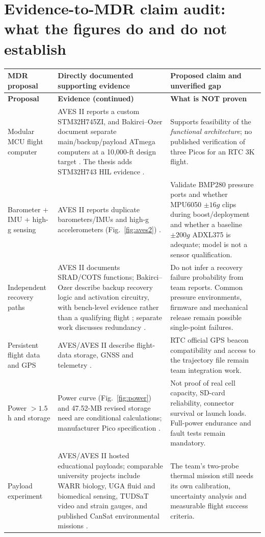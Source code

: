 \documentclass[10pt,a4paper]{article}
\begin{document}
\section{Evidence-to-MDR claim audit: what the figures do and do not establish}
\small
\begin{longtable}{@{}L{31mm}L{57mm}L{55mm}@{}}
\toprule{}\textbf{MDR proposal} & \textbf{Directly documented supporting evidence} & \textbf{Proposed claim and unverified gap}\\\midrule\endfirsthead
\toprule{}\textbf{Proposal} & \textbf{Evidence (continued)} & \textbf{What is NOT proven}\\\midrule\endhead
\bottomrule\endlastfoot
Modular MCU flight computer & AVES II reports a custom STM32H745ZI, and Bakirci--Ozer document separate main/backup/payload ATmega computers at a 10,000-ft design target \cite{astg2022aves2,bakirci2022}. The thesis adds STM32H743 HIL evidence \cite{zlamala2024}. & Supports feasibility of the \emph{functional architecture}; no published verification of three Picos for an RTC 3K flight.\\
Barometer + IMU + high-g sensing & AVES II reports duplicate barometers/IMUs and high-g accelerometers (Fig.~\ref{fig:aves2}) \cite{astg2022aves2}. & Validate BMP280 pressure ports and whether MPU6050 $\pm16g$ clips during boost/deployment and whether a baseline $\pm200g$ ADXL375 is adequate; model is not a sensor qualification.\\
Independent recovery paths & AVES II documents SRAD/COTS functions; Bakirci--Ozer describe backup recovery logic and activation circuitry, with bench-level evidence rather than a qualifying flight \cite{astg2022aves2,bakirci2022,bakirci2022recovery}; separate work discusses redundancy \cite{kahe2017}. & Do not infer a recovery failure probability from team reports. Common pressure environments, firmware and mechanical release remain possible single-point failures.\\
Persistent flight data and GPS & AVES/AVES II describe flight-data storage, GNSS and telemetry \cite{astg2021aves,astg2022aves2}. & RTC official GPS beacon compatibility and access to the trajectory file remain team integration work.\\
Power $>1.5$ h and storage & Power curve (Fig.~\ref{fig:power}) and 47.52-MB revised storage need are conditional calculations; manufacturer Pico specification \cite{rpicopico}. & Not proof of real cell capacity, SD-card reliability, connector survival or launch loads. Full-power endurance and fault tests remain mandatory.\\
Payload experiment & AVES/AVES II hosted educational payloads; comparable university projects include WARR biology, UGA fluid and biomedical sensing, TUDSaT video and strain gauges, and published CanSat environmental missions \cite{astg2021aves,astg2022aves2,warr2024spacelabs,uga2025cloud,uga2026capstone,tudsat2024frodo,ukcansat2024}. & The team's two-probe thermal mission still needs its own calibration, uncertainty analysis and measurable flight success criteria.\\
\end{longtable}
\normalsize
\end{document}
